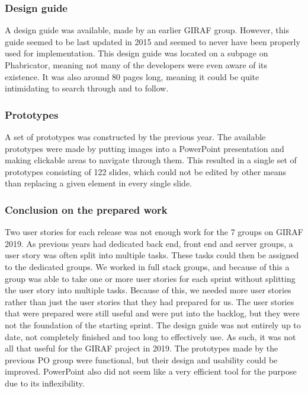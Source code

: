 \subsubsection{Design guide}
A design guide was available, made by an earlier GIRAF group.
However, this guide seemed to be last updated in 2015 and seemed to never have been properly used for implementation.
This design guide was located on a subpage on Phabricator, meaning not many of the developers were even aware of its existence.
It was also around 80 pages long, meaning it could be quite intimidating to search through and to follow.

\subsubsection{Prototypes}
A set of prototypes was constructed by the previous year.
The available prototypes were made by putting images into a PowerPoint presentation and making clickable areas to navigate through them.
This resulted in a single set of prototypes consisting of 122 slides, which could not be edited by other means than replacing a given element in every single slide.


\subsubsection{Conclusion on the prepared work}
Two user stories for each release was not enough work for the 7 groups on GIRAF 2019. 
As previous years had dedicated back end, front end and server groups, a user story was often split into multiple tasks.
These tasks could then be assigned to the dedicated groups.
We worked in full stack groups, and because of this a group was able to take one or more user stories for each sprint without splitting the user story into multiple tasks.
Because of this, we needed more user stories rather than just the user stories that they had prepared for us.
The user stories that were prepared were still useful and were put into the backlog, but they were not the foundation of the starting sprint.
The design guide was not entirely up to date, not completely finished and too long to effectively use.
As such, it was not all that useful for the GIRAF project in 2019.
The prototypes made by the previous PO group were functional, but their design and usability could be improved.
PowerPoint also did not seem like a very efficient tool for the purpose due to its inflexibility. 


